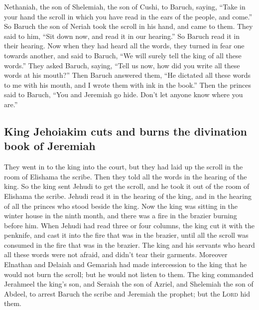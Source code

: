Nethaniah, the son of Shelemiah, the son of Cushi, to Baruch, saying,
``Take in your hand the scroll in which you have read in the ears of the
people, and come.'' So Baruch the son of Neriah took the scroll in his
hand, and came to them.  They said to him, ``Sit down
now, and read it in our hearing.'' So Baruch read it in their hearing.
 Now when they had heard all the words, they turned in
fear one towards another, and said to Baruch, ``We will surely tell the
king of all these words.''  They asked Baruch, saying,
``Tell us now, how did you write all these words at his mouth?''
 Then Baruch answered them, ``He dictated all these words
to me with his mouth, and I wrote them with ink in the book.''
 Then the princes said to Baruch, ``You and Jeremiah go
hide. Don't let anyone know where you are.''

\hypertarget{king-jehoiakim-cuts-and-burns-the-divination-book-of-jeremiah}{%
\subsection{King Jehoiakim cuts and burns the divination book of
Jeremiah}\label{king-jehoiakim-cuts-and-burns-the-divination-book-of-jeremiah}}

 They went in to the king into the court, but they had
laid up the scroll in the room of Elishama the scribe. Then they told
all the words in the hearing of the king.  So the king
sent Jehudi to get the scroll, and he took it out of the room of
Elishama the scribe. Jehudi read it in the hearing of the king, and in
the hearing of all the princes who stood beside the king.
 Now the king was sitting in the winter house in the
ninth month, and there was a fire in the brazier burning before him.
 When Jehudi had read three or four columns, the king cut
it with the penknife, and cast it into the fire that was in the brazier,
until all the scroll was consumed in the fire that was in the brazier.
 The king and his servants who heard all these words were
not afraid, and didn't tear their garments.  Moreover
Elnathan and Delaiah and Gemariah had made intercession to the king that
he would not burn the scroll; but he would not listen to them.
 The king commanded Jerahmeel the king's son, and Seraiah
the son of Azriel, and Shelemiah the son of Abdeel, to arrest Baruch the
scribe and Jeremiah the prophet; but the \textsc{Lord} hid them.

